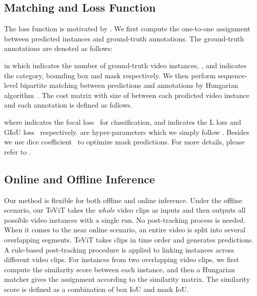 \documentclass[10pt,twocolumn,letterpaper]{article}
\begin{document}
\begin{table*}
\begin{center}
{\begin{small}
\begin{tabular}{llc|c|c|c|c|c|c}
\hline
\end{tabular}
\end{small}
}
\caption{Comparisons on YouTube-VIS- dataset~\cite{vis}. ``\checkmark" under ``MST" indicates using multi-scale training strategy,
The FPS is measured with a single TESLA V GPU.
All methods in the figure are organized into four groups. According to their basic architectures, the first two groups of methods are built upon CNN architecture, while the last two are transformer-based. According to their training inference paradigms, the first group follows the online and track-by-detect fashion, while the rest all follow offline and sequence-in-sequence-out paradigm.
}
\label{tab:vis2019}
\end{center}
\end{table*}



\subsection{Matching and Loss Function}

The loss function is motivated by \cite{detr}. We first compute the one-to-one assignment between predicted instances and ground-truth annotations.
The ground-truth annotations are denoted as follows:

in which  indicates the number of ground-truth video instances, ,  and  indicates the category, bounding box and mask respectively.
We then perform sequence-level bipartite matching between predictions and annotations by Hungarian algorithm~\cite{hungarian}. The cost matrix with size of  between each predicted video instance and each annotation is defined as follows.

where  indicates the focal loss~\cite{focalloss} for classification,  and  indicates the L loss and GIoU loss~\cite{giou} respectively.  are hyper-parameters which we simply follow \cite{queryinst, sparsercnn, defdetr}. Besides we use dice coefficient~\cite{diceloss} to optimize mask predictions. For more details, please refer to \cite{queryinst}.

\subsection{Online and Offline Inference}
\label{sec:online_and_offline_inference}

Our method is flexible for both offline and online inference. Under the offline scenario, our TeViT takes the \textit{whole} video clips as inputs and then outputs all possible video instances with a single run. No post-tracking process is needed. When it comes to the near online \cite{stemseg} scenario, an entire video is split into several overlapping segments. TeViT takes clips in time order and generates predictions. A rule-based post-tracking procedure is applied to linking instances across different video clips. For instances from two overlapping video clips, we first compute the similarity score between each instance, and then a Hungarian matcher gives the assignment according to the similarity matrix. The similarity score is defined as a combination of box IoU and mask IoU.
\end{document}
